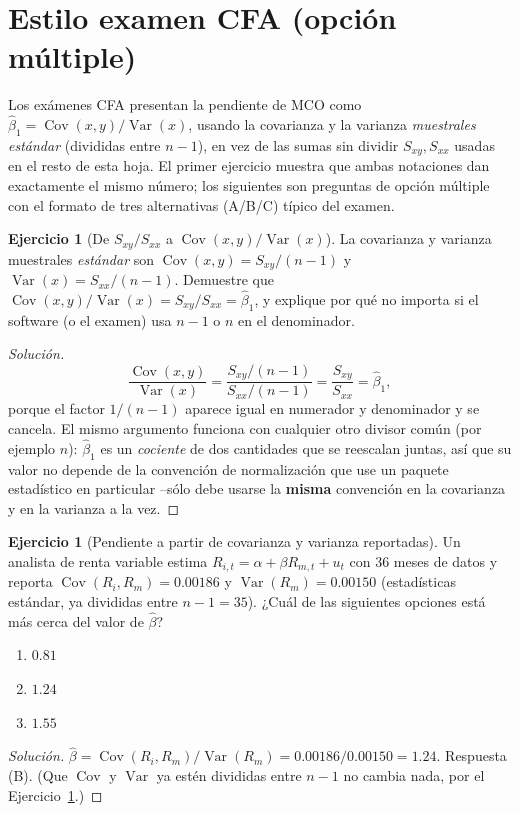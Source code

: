 \documentclass[11pt,a4paper,oneside]{article}
\theoremstyle{plain}
\theoremstyle{definition}
\newtheorem{exercise}[teorema]{Ejercicio}
\newcommand{\Cov}{\operatorname{Cov}}
\newcommand{\Var}{\operatorname{Var}}
\begin{document}
\section{Estilo examen CFA (opción múltiple)}

\begin{ideaBox}
Los exámenes CFA presentan la pendiente de MCO como
$\hat\beta_1=\Cov(x,y)/\Var(x)$, usando la covarianza y la varianza
\emph{muestrales estándar} (divididas entre $n-1$), en vez de las sumas
sin dividir $S_{xy},S_{xx}$ usadas en el resto de esta hoja. El primer
ejercicio muestra que ambas notaciones dan exactamente el mismo
número; los siguientes son preguntas de opción múltiple con el formato
de tres alternativas (A/B/C) típico del examen.
\end{ideaBox}

\begin{exercise}[De $S_{xy}/S_{xx}$ a $\Cov(x,y)/\Var(x)$]\label{ej:cfa-notacion}
La covarianza y varianza muestrales \emph{estándar} son
$\Cov(x,y)=S_{xy}/(n-1)$ y $\Var(x)=S_{xx}/(n-1)$. Demuestre que
$\Cov(x,y)/\Var(x) = S_{xy}/S_{xx} = \hat\beta_1$, y explique por qué no
importa si el software (o el examen) usa $n-1$ o $n$ en el denominador.
\end{exercise}
\begin{proof}[Solución]
\[
  \frac{\Cov(x,y)}{\Var(x)} = \frac{S_{xy}/(n-1)}{S_{xx}/(n-1)}
  = \frac{S_{xy}}{S_{xx}} = \hat\beta_1,
\]
porque el factor $1/(n-1)$ aparece igual en numerador y denominador y se
cancela. El mismo argumento funciona con cualquier otro divisor común
(por ejemplo $n$): $\hat\beta_1$ es un \emph{cociente} de dos cantidades
que se reescalan juntas, así que su valor no depende de la convención de
normalización que use un paquete estadístico en particular --sólo debe
usarse la \textbf{misma} convención en la covarianza y en la varianza a
la vez.
\end{proof}

\begin{exercise}[Pendiente a partir de covarianza y varianza reportadas]\label{ej:cfa-pendiente}
Un analista de renta variable estima
$R_{i,t}=\alpha+\beta R_{m,t}+u_t$ con 36 meses de datos y reporta
$\Cov(R_i,R_m)=0.00186$ y $\Var(R_m)=0.00150$ (estadísticas estándar,
ya divididas entre $n-1=35$). ¿Cuál de las siguientes opciones está más
cerca del valor de $\hat\beta$?
\begin{enumerate}[label=(\Alph*),nosep,leftmargin=2.2em]
  \item $0.81$
  \item $1.24$
  \item $1.55$
\end{enumerate}
\end{exercise}
\begin{proof}[Solución]
$\hat\beta=\Cov(R_i,R_m)/\Var(R_m) = 0.00186/0.00150 = 1.24$. Respuesta
(B). (Que $\Cov$ y $\Var$ ya estén divididas entre $n-1$ no cambia nada,
por el Ejercicio~\ref{ej:cfa-notacion}.)
\end{proof}
\end{document}
